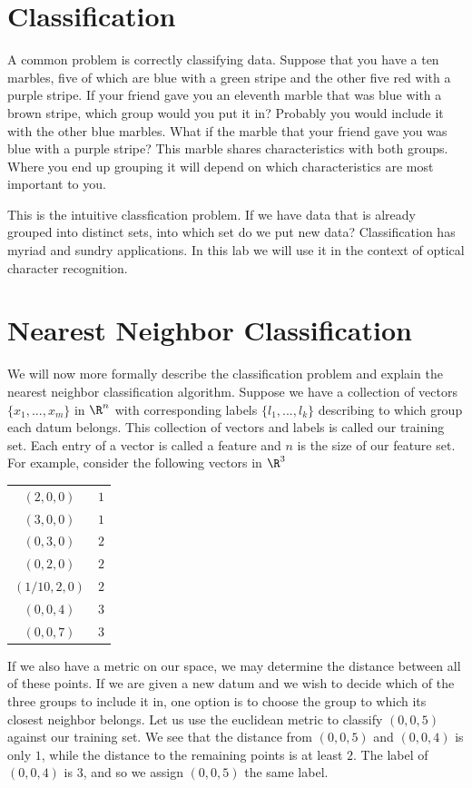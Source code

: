 \section*{Classification}
A common problem is correctly classifying data.  
Suppose that you have a ten marbles, five of which are blue with a green stripe and the other five red with a purple stripe.  
If your friend gave you an eleventh marble that was blue with a brown stripe, which group would you put it in?  
Probably you would include it with the other blue marbles.  
What if the marble that your friend gave you was blue with a purple stripe?  
This marble shares characteristics with both groups.  
Where you end up grouping it will depend on which characteristics are most important to you.

This is the intuitive classfication problem.  
If we have data that is already grouped into distinct sets, into which set do we put new data?  
Classification has myriad and sundry applications.  
In this lab we will use it in the context of optical character recognition.

\section*{Nearest Neighbor Classification}
We will now more formally describe the classification problem and explain the nearest neighbor classification algorithm.  
Suppose we have a collection of vectors $\{x_1, ..., x_m\}$ in $\R^n$ with corresponding labels $\{l_1, ..., l_k\}$ describing to which group each datum belongs.  
This collection of vectors and labels is called our training set.  
Each entry of a vector is called a feature and $n$ is the size of our feature set.  
For example, consider the following vectors in $\R^3$

\begin{center}
\begin{tabular}{cc}
$(2,0,0)$ & $1$ \\
$(3,0,0)$ & $1$ \\
$(0,3,0)$ & $2$ \\
$(0,2,0)$ & $2$ \\
$(1/10,2,0)$ & $2$ \\
$(0,0,4)$ & $3$ \\
$(0,0,7)$ & $3$ \\
\end{tabular}
\end{center}

If we also have a metric on our space, we may determine the distance between all of these points.  
If we are given a new datum and we wish to decide which of the three groups to include it in, one option is to choose the group to which its closest neighbor belongs.  
Let us use the euclidean metric to classify $(0,0,5)$ against our training set.  
We see that the distance from $(0,0,5)$ and $(0,0,4)$ is only $1$, while the distance to the remaining points is at least $2$.  
The label of $(0,0,4)$ is $3$, and so we assign $(0,0,5)$ the same label.

